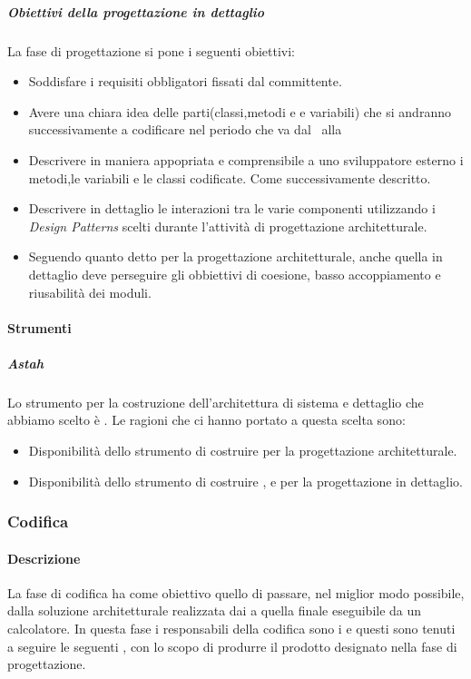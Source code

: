 \subparagraph{Obiettivi della progettazione in dettaglio}
La fase di progettazione si pone i seguenti obiettivi:
\begin{itemize}
\item Soddisfare i requisiti obbligatori fissati dal committente.
\item Avere una chiara idea delle parti(classi,metodi e e variabili) che si andranno successivamente a codificare nel periodo che va dal \RP\ alla \RQ
\item Descrivere in maniera appopriata e comprensibile a uno sviluppatore esterno i metodi,le variabili e le classi codificate. Come successivamente descritto.
\item Descrivere in dettaglio le interazioni tra le varie componenti utilizzando i \textit{Design Patterns} scelti durante l'attività di progettazione architetturale.
\item Seguendo quanto detto per la progettazione architetturale, anche quella in dettaglio deve perseguire gli obbiettivi di coesione, basso accoppiamento e riusabilità dei moduli.
\end{itemize}

\paragraph{Strumenti}

\subparagraph{Astah}
Lo strumento per la costruzione dell'architettura di sistema e dettaglio che abbiamo scelto è .
Le ragioni che ci hanno portato a questa scelta sono:
\begin{itemize}
\item Disponibilità dello strumento di costruire  per la progettazione architetturale.
\item Disponibilità dello strumento di costruire ,  e  per la progettazione in dettaglio.
\end{itemize}

\subsubsection{Codifica}
\paragraph{Descrizione}
La fase di codifica ha come obiettivo quello di passare, nel miglior modo possibile, dalla soluzione architetturale realizzata dai \textit{\ProgP} a quella finale eseguibile da un calcolatore.
In questa fase i responsabili della codifica sono i \textit{\ProgrP} e questi sono tenuti a seguire le seguenti , con lo scopo di produrre il prodotto designato nella fase di progettazione.

